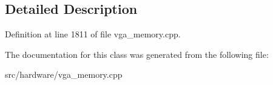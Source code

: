 \subsection{Detailed Description}


Definition at line 1811 of file vga\-\_\-memory.\-cpp.



The documentation for this class was generated from the following file\-:\begin{DoxyCompactItemize}
\item 
src/hardware/vga\-\_\-memory.\-cpp\end{DoxyCompactItemize}
